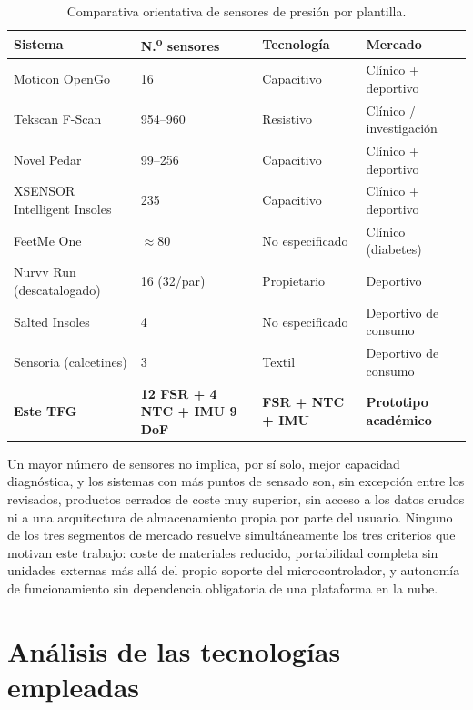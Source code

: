 \begin{IAtext}
\begin{table}[H]
\centering
\caption{Comparativa orientativa de sensores de presión por plantilla.}
\label{tab:mercado_sensores}
\begin{tabular}{|l|l|l|l|}
\hline
\textbf{Sistema} & \textbf{N.\textsuperscript{o} sensores} & \textbf{Tecnología} & \textbf{Mercado} \\
\hline
Moticon OpenGo & 16 & Capacitivo & Clínico + deportivo \\
Tekscan F-Scan & 954--960 & Resistivo & Clínico / investigación \\
Novel Pedar & 99--256 & Capacitivo & Clínico + deportivo \\
XSENSOR Intelligent Insoles & 235 & Capacitivo & Clínico + deportivo \\
FeetMe One & $\approx$80 & No especificado & Clínico (diabetes) \\
Nurvv Run (descatalogado) & 16 (32/par) & Propietario & Deportivo \\
Salted Insoles & 4 & No especificado & Deportivo de consumo \\
Sensoria (calcetines) & 3 & Textil & Deportivo de consumo \\
\textbf{Este TFG} & \textbf{12 FSR + 4 NTC + IMU 9 DoF} & \textbf{FSR + NTC + IMU} & \textbf{Prototipo académico} \\
\hline
\end{tabular}
\end{table}

Un mayor número de sensores no implica, por sí solo, mejor capacidad diagnóstica, y los sistemas con más puntos de sensado son, sin excepción entre los revisados, productos cerrados de coste muy superior, sin acceso a los datos crudos ni a una arquitectura de almacenamiento propia por parte del usuario. Ninguno de los tres segmentos de mercado resuelve simultáneamente los tres criterios que motivan este trabajo: coste de materiales reducido, portabilidad completa sin unidades externas más allá del propio soporte del microcontrolador, y autonomía de funcionamiento sin dependencia obligatoria de una plataforma en la nube.

\section{Análisis de las tecnologías empleadas}


\end{IAtext}

